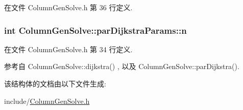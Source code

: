 在文件 Column\+Gen\+Solve.\+h 第 36 行定义.

\subsubsection[{\texorpdfstring{n}{n}}]{\setlength{\rightskip}{0pt plus 5cm}int Column\+Gen\+Solve\+::par\+Dijkstra\+Params\+::n}\hypertarget{structColumnGenSolve_1_1parDijkstraParams_a33cbd8316dde8102d996c01ad2ae68d5}{}\label{structColumnGenSolve_1_1parDijkstraParams_a33cbd8316dde8102d996c01ad2ae68d5}


在文件 Column\+Gen\+Solve.\+h 第 34 行定义.



参考自 Column\+Gen\+Solve\+::dijkstra() , 以及 Column\+Gen\+Solve\+::par\+Dijkstra().



该结构体的文档由以下文件生成\+:\begin{DoxyCompactItemize}
\item 
include/\hyperlink{ColumnGenSolve_8h}{Column\+Gen\+Solve.\+h}\end{DoxyCompactItemize}
